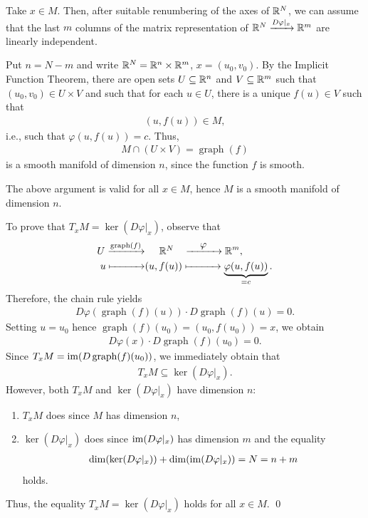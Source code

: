 \documentclass[11pt,a4paper,twoside,openany]{report}
\theoremstyle{my-theorem}
\theoremstyle{non-theorem}
\renewenvironment{proof}[1][\proofname]{{\scshape #1. }}{\qed}
\begin{document}
		\begin{proof}
			Take $x \in M$. Then, after suitable renumbering of the axes of ${\mathbb R}^N$, we can assume that the last $m$ columns of the matrix representation of ${\mathbb R}^N \xrightarrow{D\varphi|_x} {\mathbb R}^m$ are linearly independent.
			
			Put $n=N-m$ and write ${\mathbb R}^N = {\mathbb R}^n \times {\mathbb R}^m$, $x = (u_0,v_0)$. By the Implicit Function Theorem, there are open sets $U \subseteq {\mathbb R}^n$ and $V \subseteq {\mathbb R}^m$ such that $(u_0,v_0) \in U \times V$ and such that for each $u \in U$, there is a unique $f(u) \in V$ such that
			\begin{align*}
				(u,f(u)) \in M,
			\end{align*}
			i.e., such that $\varphi(u,f(u)) = c$. Thus,
			\begin{align*}
				M \cap (U \times V) = \operatorname{graph}(f)
			\end{align*}
			is a smooth manifold of dimension $n$, since the function $f$ is smooth.
			
			The above argument is valid for all $x \in M$, hence $M$ is a smooth manifold of dimension $n$.
			
			To prove that $T_xM = \ker(D\varphi|_x)$, observe that
			\begin{align*}
				U \xrightarrow{\operatorname{graph}(f)} &\makebox[3em]{$\quad\ \R^N$} \quad\!\xrightarrow{\makebox[3em]{$\varphi$}} \R^m,
			\\
				u \xmapsto{\makebox[3em]{}} &(u,f(u)) \xmapsto{\makebox[3em]{}} \underbrace{\varphi(u,f(u))}_{=c}.
			\end{align*}
			Therefore, the chain rule yields
			\begin{align*}
				D\varphi(\operatorname{graph}(f)(u)) \cdot D\operatorname{graph}(f)(u) = 0.
			\end{align*}
			Setting $u=u_0$ hence $\operatorname{graph}(f)(u_0) = (u_0,f(u_0)) = x$, we obtain
			\begin{align*}
				D\varphi(x) \cdot D\operatorname{graph}(f)(u_0) = 0.
			\end{align*}
			Since $T_xM = \operatorname{im}(D\operatorname{graph}(f)(u_0))$, we immediately obtain that
			\begin{align*}
				T_xM \subseteq \ker(D\varphi|_x).
			\end{align*}
			However, both $T_xM$ and $\ker(D\varphi|_x)$ have dimension $n$:
			\begin{enumerate}[label=\rm(\roman*)]
				\item $T_xM$ does since $M$ has dimension $n$,
				\item $\ker(D\varphi|_x)$ does since $\operatorname{im}(D\varphi|_x)$ has dimension $m$ and the equality
				\begin{align*}
					\dim(\ker(D\varphi|_x)) + \dim(\operatorname{im}(D\varphi|_x)) = N = n+m          
				\end{align*}                                                         
				holds.                                                               
			\end{enumerate}                                                       
			Thus, the equality $T_xM = \ker(D\varphi|_x)$ holds for all $x \in M$.
		\end{proof}
	
\end{document}
